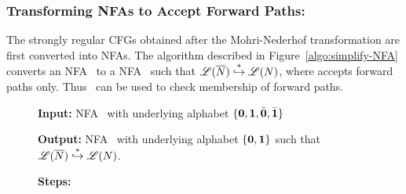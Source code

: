 \documentclass[9pt]{sigplanconf}
\newcommand{\comment}[1]{{\color{Myblue}{(#1)}}}
\begin{document}
\begin{enumerate}
\subsubsection{Transforming NFAs to Accept Forward Paths:}
The strongly regular CFGs obtained after the Mohri-Nederhof
transformation are
  first converted  into  NFAs.  The        algorithm         described
      in
Figure~\ref{algo:simplify-NFA} converts  an NFA \ntbar\  to a NFA
\nt\ such that  $\mathscr{L}({\overline{N}}) \stackrel{*}{\hookrightarrow}
\mathscr{L}({N})$, where {\nt} accepts forward paths only.
\comment{Rewrite the algorithm to handle \cbar and update the example
automata}
Thus  \nt\  can  be  used  to  check
membership of forward paths.

\begin{figure*}[t]
\begin{boxedminipage}{\textwidth}
\begin{center}
  \raggedright  {\bf  Input:}  NFA \ntbar\  with  underlying
  alphabet $\lbrace \mathbf{0}, \mathbf{1}, \bar{\mathbf{0}}, \bar{\mathbf{1}}\rbrace$ \\
%
  \raggedright{\bf Output:} NFA  \nt\ with  underlying
  alphabet $\lbrace \mathbf{0}, \mathbf{1} \rbrace$ such that
  $\mathscr{L}({\overline{N}}) \stackrel{*}{\hookrightarrow} \mathscr{L}({N})$.
  \\
%

  \raggedright{\bf Steps:}





\end{center}
\end{boxedminipage}
\end{figure*}
\end{enumerate}
\end{document}

